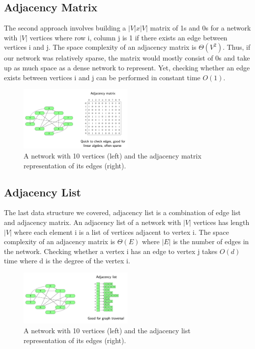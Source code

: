 \subsection{Adjacency Matrix}
The second approach involves building a $|V|x|V|$ matrix of 1s and 0s for a network with $|V|$ vertices where row i, column j is 1 if there exists an edge between vertices i and j. The space complexity of an adjacency matrix is $\Theta(V^{2})$. Thus, if our network was relatively sparse, the matrix would mostly consist of 0s and take up as much space as a dense network to represent. Yet, checking whether an edge exists between vertices i and j can be performed in constant time $O(1)$.

\begin{figure}[ht]
  \begin{center}
    \includegraphics[width=0.5\textwidth]{figures/adjacency_matrix.png}
    \caption{
      A network with 10 vertices (left) and the adjacency matrix representation of its edges (right).}
    \label{fig:adjacency_matrix}
  \end{center}
\end{figure}

\subsection{Adjacency List}
The last data structure we covered, adjacency list is a combination of edge list and adjacency matrix. An adjacency list of a network with $|V|$ vertices has length $|V|$ where each element i is a list of vertices adjacent to vertex i. The space complexity of an adjacency matrix is $\Theta(E)$ where $|E|$ is the number of edges in the network. Checking whether a vertex i has an edge to vertex j takes $O(d)$ time where d is the degree of the vertex i.

\begin{figure}[ht]
  \begin{center}
    \includegraphics[width=0.5\textwidth]{figures/adjacency_list.png}
    \caption{
      A network with 10 vertices (left) and the adjacency list representation of its edges (right).}
    \label{fig:adjacency_list}
  \end{center}
\end{figure}

